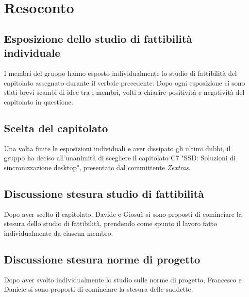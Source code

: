 \newpage


\section{Resoconto}

\subsection{Esposizione dello studio di fattibilità individuale }

I membri del gruppo hanno esposto individualmente lo studio di fattibilità del capitolato assegnato durante il verbale precedente. Dopo ogni esposizione ci sono stati brevi scambi di idee tra i membri, volti a chiarire positività e negatività del capitolato in questione.

\subsection{Scelta del capitolato}

Una volta finite le esposizioni individuali e aver dissipato gli ultimi dubbi,  il gruppo ha deciso all'unanimità di scegliere il capitolato C7 "SSD: Soluzioni di sincronizzazione desktop",  presentato dal committente \textit{Zextras}.

\subsection{Discussione stesura studio di fattibilità}

Dopo aver scelto il capitolato,  Davide e Giosuè si sono proposti di cominciare la stesura dello studio di fattibilità, prendendo come spunto il lavoro fatto individualmente da ciascun membro.

\subsection{Discussione stesura norme di progetto}

Dopo aver svolto individualmente lo studio sulle norme di progetto, Francesco e Daniele si sono proposti di cominciare la stesura delle suddette.


\newpage

